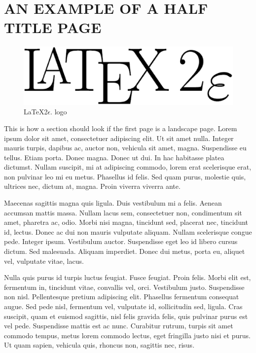 \chapter{AN EXAMPLE OF A HALF TITLE PAGE}%
\label{appendixB}

\clearpage %
\thispagestyle{plain}
\begin{landscape}
\begin{figure}

  \begin{center}
    \includegraphics[width=6in]{images/LaTeX2e_logo.eps}
    \caption{\LaTeX 2\ensuremath{\epsilon.} logo}\label{biglogo}
  \end{center}
\end{figure}
\end{landscape}


This is how a section should look if the first page is a landscape page.
Lorem ipsum dolor sit amet, consectetuer adipiscing elit. Ut sit
amet nulla. Integer mauris turpis, dapibus ac, auctor non, vehicula
sit amet, magna. Suspendisse eu tellus. Etiam porta. Donec magna.
Donec ut dui. In hac habitasse platea dictumst. Nullam suscipit, mi
at adipiscing commodo, lorem erat scelerisque erat, non pulvinar leo
mi eu metus. Phasellus id felis. Sed quam purus, molestie quis,
ultrices nec, dictum at, magna. Proin viverra viverra ante.

Maecenas sagittis magna quis ligula. Duis vestibulum mi a felis.
Aenean accumsan mattis massa. Nullam lacus sem, consectetuer non,
condimentum sit amet, pharetra ac, odio. Morbi nisi magna, tincidunt
sed, placerat nec, tincidunt id, lectus. Donec ac dui non mauris
vulputate aliquam. Nullam scelerisque congue pede. Integer ipsum.
Vestibulum auctor. Suspendisse eget leo id libero cursus dictum. Sed
malesuada. Aliquam imperdiet. Donec dui metus, porta eu, aliquet
vel, vulputate vitae, lacus.

Nulla quis purus id turpis luctus feugiat. Fusce feugiat. Proin
felis. Morbi elit est, fermentum in, tincidunt vitae, convallis vel,
orci. Vestibulum justo. Suspendisse non nisl. Pellentesque pretium
adipiscing elit. Phasellus fermentum consequat augue. Sed pede nisl,
fermentum vel, vulputate id, sollicitudin sed, ligula. Cras
suscipit, quam et euismod sagittis, nisl felis gravida felis, quis
pulvinar purus est vel pede. Suspendisse mattis est ac nunc.
Curabitur rutrum, turpis sit amet commodo tempus, metus lorem
commodo lectus, eget fringilla justo nisi et purus. Ut quam sapien,
vehicula quis, rhoncus non, sagittis nec, risus.

